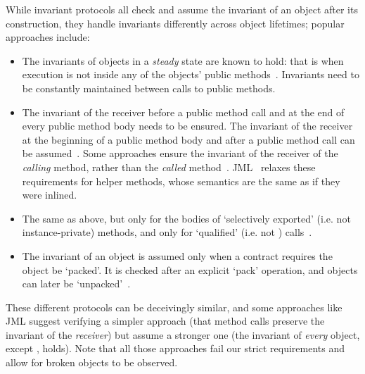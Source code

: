 While invariant protocols all check and assume the invariant of an object after its construction, they handle invariants differently across object lifetimes; popular approaches include:%
\begin{itemize}
\item The invariants of objects in a \textit{steady} state are known to hold: that is when execution is not inside any of the objects' public methods~\cite{Gopinathan:2008:RMO:1483018.1483028}. Invariants need to be constantly maintained between calls to public methods.%
\item 
The invariant of the receiver before a public method call and at the end of every public method body needs to be ensured. The invariant of the receiver at the beginning of a public method body and after a public method call can be assumed~\cite{Burdy2005,drossopoulou2008unified}.  
Some approaches ensure the invariant of the receiver of the \emph{calling} method, rather than the \emph{called} method~\cite{DBLP:journals/scp/MullerPL06}.
JML~\cite{JML} relaxes these requirements for helper methods, whose semantics are the same as if they were inlined.


\item The same as above, but only for the bodies of `selectively exported' (i.e. not instance-private) methods, and only for `qualified' (i.e. not \Q@this@) calls~\cite{meyer2016class}.
\item The invariant of an object is assumed only when a contract requires the object be `packed'. It is checked after an explicit `pack' operation, and objects can later be `unpacked'~\cite{DBLP:journals/jot/BarnettDFLS04}.
\end{itemize}\SS\LS[0.5]
\noindent These different protocols can be deceivingly similar, and 
some approaches like JML suggest verifying a simpler approach (that method calls preserve the invariant of the \emph{receiver}) but assume a stronger one (the invariant of \emph{every} object, except \Q@this@, holds).
Note that all those approaches fail our strict requirements and allow for broken objects to be observed.


